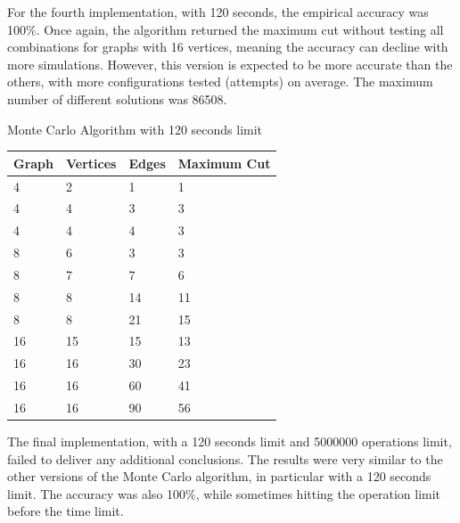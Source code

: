 \documentclass[]{revdetua}
\begin{document}
For the fourth implementation, with 120 seconds, the empirical accuracy was 100\%. Once again, the algorithm returned the maximum cut without testing all combinations for graphs with 16 vertices, meaning the accuracy can decline with more simulations. However, this version is expected to be more accurate than the others, with more configurations tested (attempts) on average. The maximum number of different solutions was 86508.

\begin{table}[!ht]
    \centering
    Monte Carlo Algorithm with 120 seconds limit
    \begin{tabular}{|l|l|l|l|}
    \hline
        Graph & Vertices & Edges & Maximum Cut \\ \hline
        4 & 2 & 1 & 1 \\ \hline
        4 & 4 & 3 & 3 \\ \hline
        4 & 4 & 4 & 3 \\ \hline
        8 & 6 & 3 & 3 \\ \hline
        8 & 7 & 7 & 6 \\ \hline
        8 & 8 & 14 & 11 \\ \hline
        8 & 8 & 21 & 15 \\ \hline
        16 & 15 & 15 & 13 \\ \hline
        16 & 16 & 30 & 23 \\ \hline
        16 & 16 & 60 & 41 \\ \hline
        16 & 16 & 90 & 56 \\ \hline
    \end{tabular}
\end{table}

The final implementation, with a 120 seconds limit and 5000000 operations limit, failed to deliver any additional conclusions. The results were very similar to the other versions of the Monte Carlo algorithm, in particular with a 120 seconds limit. The accuracy was also 100\%, while sometimes hitting the operation limit before the time limit. 
\end{document}
